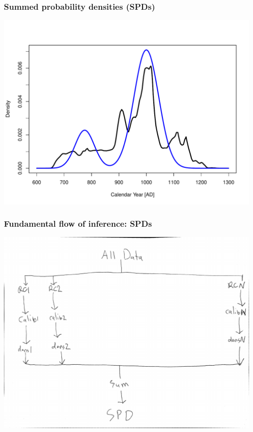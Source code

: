 \documentclass{beamer}
\begin{document}
\begin{frame}[t]
  \frametitle{Summed probability densities (SPDs)}
    \includegraphics[height=.85\textheight]{spdall_sim.pdf}
\end{frame}

\begin{frame}[t]
  \frametitle{Fundamental flow of inference: SPDs}
    \includegraphics[height=.85\textheight]{spd_flow.pdf}
\end{frame}
\end{document}
